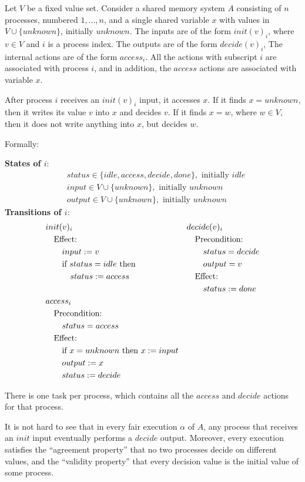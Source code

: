 \documentclass[11pt]{article}
\begin{document}
\begin{examplle}
Let \(V\) be a fixed value set. Consider a shared memory system \(A\) consisting of \(n\) processes,
numbered \(1,\dots,n\), and a single shared variable \(x\) with values in \(V\cup\{unknown\}\),
initially \(unknown\). The inputs are of the form \(init(v)_i\), where \(v\in V\) and \(i\) is a
process index. The outputs are of the form \(decide(v)_i\), The internal actions are of the form
\(access_i\). All the actions with subscript \(i\) are associated with process \(i\), and in addition,
the \(access\) actions are associated with variable \(x\).

After process \(i\) receives an \(init(v)_i\) input, it accesses \(x\). If it finds \(x=unknown\),
then it writes its value \(v\) into \(x\) and decides \(v\). If it finds \(x=w\), where \(w\in V\),
then it does not write anything into \(x\), but decides \(w\).

Formally:

\textbf{States of \(i\)}:
\begin{align*}
&status\in\{idle,access,decide,done\}, \text{ initially } idle\\
&input\in V\cup\{unknown\},  \text{ initially } unknown\\
&output\in V\cup\{unknown\}, \text{ initially } unknown
\end{align*}
\textbf{Transitions of \(i\)}:
\begin{alignat*}{2}
&init(v)_i\hspace{3.5cm}&&decide(v)_i\\
&\quad\text{Effect:}&&\quad\text{Precondition:}\\
&\quad\quad input:=v&&\quad\quad status=decide\\
&\quad\quad\text{if }status=idle\text{ then}&&\quad\quad output=v\\
&\quad\quad\quad status:=access&&\quad\text{Effect:}\\
&&&\quad\quad status:=done\\
&access_i\\
&\quad\text{Precondition:}\\
&\quad\quad status=access\\
&\quad\text{Effect:}\\
&\quad\quad\text{if }x=unknown\text{ then }x:=input\\
&\quad\quad output:=x\\
&\quad\quad status:=decide
\end{alignat*}

There is one task per process, which contains all the \(access\) and \(decide\) actions for that
process.

It is not hard to see that in every fair execution \(\alpha\) of \(A\), any process that receives an
\(init\) input eventually performs a \(decide\) output. Moreover, every execution satisfies the
``agreement property'' that no two processes decide on different values, and the ``validity property''
that every decision value is the initial value of some process.
\end{examplle}
\end{document}
